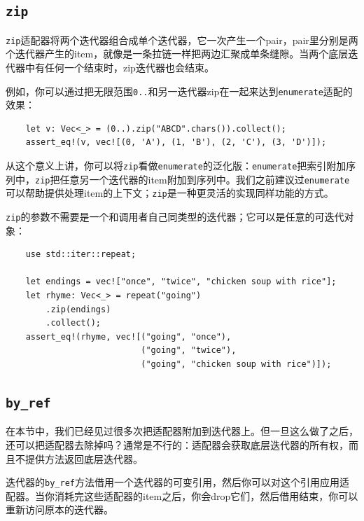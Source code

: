 \subsection{\texttt{zip}}
\texttt{zip}适配器将两个迭代器组合成单个迭代器，它一次产生一个pair，pair里分别是两个迭代器产生的item，就像是一条拉链一样把两边汇聚成单条缝隙。当两个底层迭代器中有任何一个结束时，zip迭代器也会结束。

例如，你可以通过把无限范围\texttt{0..}和另一迭代器zip在一起来达到\texttt{enumerate}适配的效果：
\begin{verbatim}
    let v: Vec<_> = (0..).zip("ABCD".chars()).collect();
    assert_eq!(v, vec![(0, 'A'), (1, 'B'), (2, 'C'), (3, 'D')]);
\end{verbatim}

从这个意义上讲，你可以将\texttt{zip}看做\texttt{enumerate}的泛化版：\texttt{enumerate}把索引附加序列中，\texttt{zip}把任意另一个迭代器的item附加到序列中。我们之前建议过\texttt{enumerate}可以帮助提供处理item的上下文；\texttt{zip}是一种更灵活的实现同样功能的方式。

\texttt{zip}的参数不需要是一个和调用者自己同类型的迭代器；它可以是任意的可迭代对象：
\begin{verbatim}
    use std::iter::repeat;

    let endings = vec!["once", "twice", "chicken soup with rice"];
    let rhyme: Vec<_> = repeat("going")
        .zip(endings)
        .collect();
    assert_eq!(rhyme, vec![("going", "once"),
                           ("going", "twice"),
                           ("going", "chicken soup with rice")]);
\end{verbatim}

\subsection{\texttt{by\_ref}}
在本节中，我们已经见过很多次把适配器附加到迭代器上。但一旦这么做了之后，还可以把适配器去除掉吗？通常是不行的：适配器会获取底层迭代器的所有权，而且不提供方法返回底层迭代器。

迭代器的\texttt{by\_ref}方法借用一个迭代器的可变引用，然后你可以对这个引用应用适配器。当你消耗完这些适配器的item之后，你会drop它们，然后借用结束，你可以重新访问原本的迭代器。

